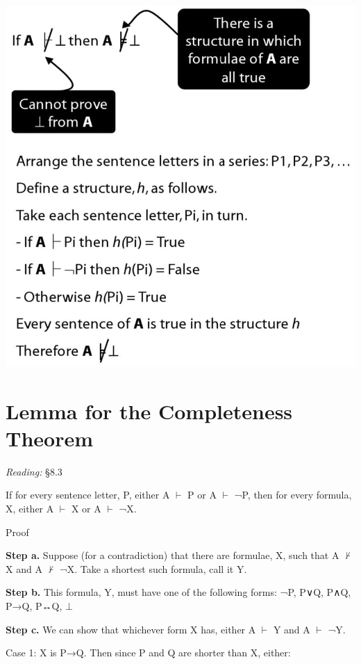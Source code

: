 \documentclass[12pt]{extarticle}
\begin{document}
\begin{multicols*}{3}
\begin{center}
\includegraphics[scale=0.3]{img/unit_450.png}
\end{center}
 
 
 
 
\section{Lemma for the Completeness Theorem}
 
\emph{Reading:} §8.3
 
 
If for every sentence letter, P, either A $\vdash$ P or A $\vdash$ ¬P, then for every formula, X, either A $\vdash$ X or A $\vdash$ ¬X.
 
Proof
 
\textbf{Step a.} Suppose (for a contradiction) that there are formulae, X, such that A $\nvdash$ X and A $\nvdash$ ¬X. Take a shortest such formula, call it Y.
 
\textbf{Step b.} This formula, Y, must have one of the following forms: ¬P, P∨Q, P∧Q, P→Q, P↔Q, $\bot$
 
\textbf{Step c.} We can show that whichever form X has, either A $\vdash$ Y and A $\vdash$ ¬Y.
 
Case 1: X is P→Q. Then since P and Q are shorter than X, either:
 

\end{multicols*}
\end{document}
